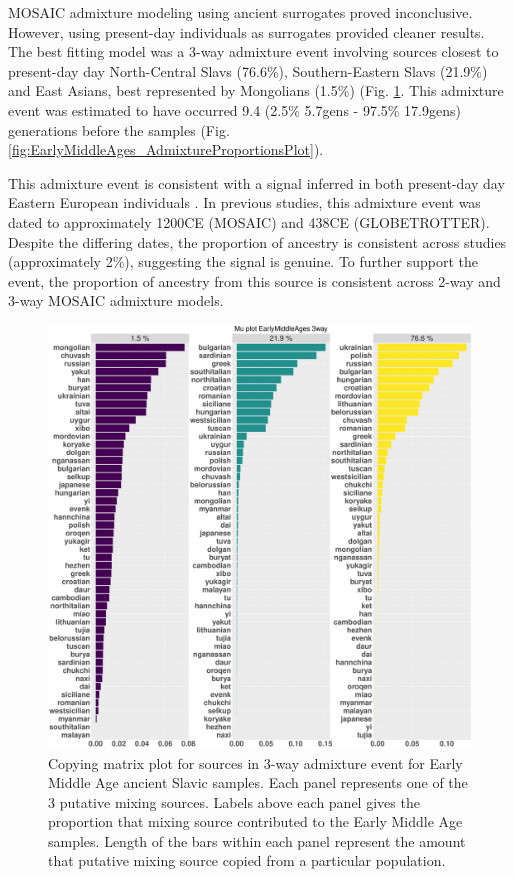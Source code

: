 MOSAIC admixture modeling using ancient surrogates proved inconclusive. However, using present-day individuals as surrogates provided cleaner results. The best fitting model was a 3-way admixture event involving sources closest to present-day day North-Central Slavs (76.6\%), Southern-Eastern Slavs (21.9\%) and East Asians, best represented by Mongolians (1.5\%) (Fig. \ref{fig:EarlyMiddleAges_MOSAIC_3way_moderns_Mu}. This admixture event was estimated to have occurred 9.4 (2.5\% 5.7gens - 97.5\% 17.9gens) generations before the samples (Fig. \ref{fig:EarlyMiddleAges_AdmixtureProportionsPlot}). 

This admixture event is consistent with a signal inferred in both present-day day Eastern European individuals \cite{MOSAIC_2019, Hellenthal2014}. In previous studies, this admixture event was dated to approximately 1200CE (MOSAIC) and 438CE (GLOBETROTTER). Despite the differing dates, the proportion of ancestry is consistent across studies (approximately 2\%), suggesting the signal is genuine. To further support the event, the proportion of ancestry from this source is consistent across 2-way and 3-way MOSAIC admixture models. 

\begin{figure}[htp]
    \centering
    \includegraphics[width=1.0\textwidth]{../images/chapter5/Mu_plot_EarlyMiddleAges_3way.pdf}
    \caption{Copying matrix plot for sources in 3-way admixture event for Early Middle Age ancient Slavic samples. Each panel represents one of the 3 putative mixing sources. Labels above each panel gives the proportion that mixing source contributed to the Early Middle Age samples. Length of the bars within each panel represent the amount that putative mixing source copied from a particular population.}
    \label{fig:EarlyMiddleAges_MOSAIC_3way_moderns_Mu}
\end{figure}

